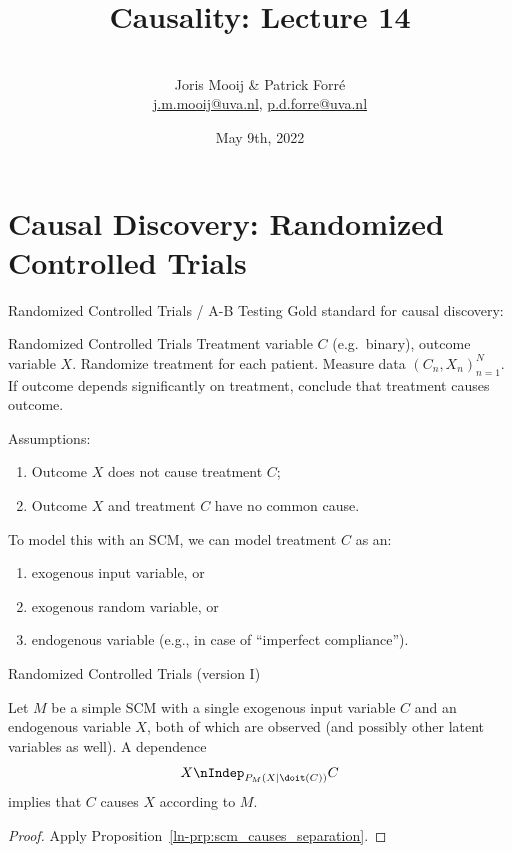 \title[Causality]{Causality: Lecture 14}
\author[Joris Mooij]{\\[5mm]\large Joris Mooij \& Patrick Forr\'e\\
\url{j.m.mooij@uva.nl}, \url{p.d.forre@uva.nl}}
\date[2022-05-09]{\normalsize May 9th, 2022}
\maketitle

\part{Causal Discovery: Randomized Controlled Trials}
\frame{\partpage}

\begin{frame}{Randomized Controlled Trials / A-B Testing}
  Gold standard for causal discovery:
  \begin{block}{Randomized Controlled Trials}
  Treatment variable $C$ (e.g.\ binary), outcome variable $X$.
  Randomize treatment for each patient.
  Measure data $(C_n,X_n)_{n=1}^N$.
  If outcome depends significantly on treatment, conclude that treatment causes outcome.
  \end{block}

  Assumptions:
  \begin{enumerate}
    \item Outcome $X$ does not cause treatment $C$;
    \item Outcome $X$ and treatment $C$ have no common cause.
  \end{enumerate}

  \bigskip
  To model this with an SCM, we can model treatment $C$ as an:
  \begin{enumerate}
    \item exogenous input variable, or
    \item exogenous random variable, or
    \item endogenous variable (e.g., in case of ``imperfect compliance'').
  \end{enumerate}
\end{frame}

\begin{frame}{Randomized Controlled Trials (version I)}
\begin{Prp}
Let $M$ be a simple SCM with a single exogenous input variable $C$ and an 
endogenous variable $X$, both of which are observed (and possibly other latent variables as well).
A dependence 
  $$X \nIndep_{P_{M}(X\mid\doit(C))} C $$
implies that $C$ causes $X$ according to $M$. 
\end{Prp}
\begin{proof}
  Apply Proposition~\ref{ln-prp:scm_causes_separation}.
\end{proof}
\end{frame}

